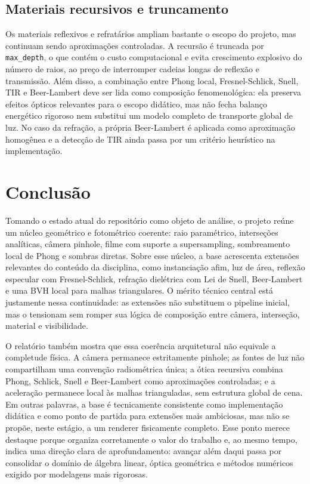 \documentclass[portuguese]{sbcreviews-2025}%
\begin{document}
\subsection{Materiais recursivos e truncamento}
\label{sec:lim-recursao-v3}

Os materiais reflexivos e refratários ampliam bastante o escopo do projeto, mas continuam sendo aproximações controladas. A recursão é truncada por \texttt{max\_depth}, o que contém o custo computacional e evita crescimento explosivo do número de raios, ao preço de interromper cadeias longas de reflexão e transmissão. Além disso, a combinação entre Phong local, Fresnel-Schlick, Snell, TIR e Beer-Lambert deve ser lida como composição fenomenológica: ela preserva efeitos ópticos relevantes para o escopo didático, mas não fecha balanço energético rigoroso nem substitui um modelo completo de transporte global de luz. No caso da refração, a própria Beer-Lambert é aplicada como aproximação homogênea e a detecção de TIR ainda passa por um critério heurístico na implementação.

\section{Conclusão}
\label{sec:conclusao-v3}

Tomando o estado atual do repositório como objeto de análise, o projeto reúne um núcleo geométrico e fotométrico coerente: raio paramétrico, interseções analíticas, câmera pinhole, filme com suporte a supersampling, sombreamento local de Phong e sombras diretas. Sobre esse núcleo, a base acrescenta extensões relevantes do conteúdo da disciplina, como instanciação afim, luz de área, reflexão especular com Fresnel-Schlick, refração dielétrica com Lei de Snell, Beer-Lambert e uma BVH local para malhas triangulares. O mérito técnico central está justamente nessa continuidade: as extensões não substituem o pipeline inicial, mas o tensionam sem romper sua lógica de composição entre câmera, interseção, material e visibilidade.

O relatório também mostra que essa coerência arquitetural não equivale a completude física. A câmera permanece estritamente pinhole; as fontes de luz não compartilham uma convenção radiométrica única; a ótica recursiva combina Phong, Schlick, Snell e Beer-Lambert como aproximações controladas; e a aceleração permanece local às malhas trianguladas, sem estrutura global de cena. Em outras palavras, a base é tecnicamente consistente como implementação didática e como ponto de partida para extensões mais ambiciosas, mas não se propõe, neste estágio, a um renderer fisicamente completo. Esse ponto merece destaque porque organiza corretamente o valor do trabalho e, ao mesmo tempo, indica uma direção clara de aprofundamento: avançar além daqui passa por consolidar o domínio de álgebra linear, óptica geométrica e métodos numéricos exigido por modelagens mais rigorosas.
\end{document}
